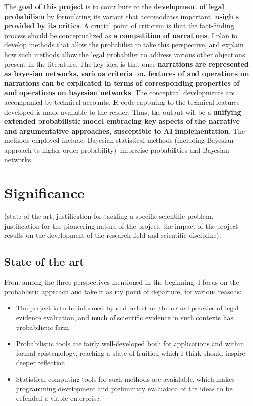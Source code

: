 \documentclass[11pt,dvipsnames,enabledeprecatedfontcommands]{scrartcl}
\begin{document}
The \textbf{goal of this project} is to contribute to the
\textbf{development of legal probabilism} by formulating its variant
that accomodates important \textbf{insights provided by its critics}. A
crucial point of criticism is that the fact-finding process should be
conceptualized as \textbf{a competition of narrations}. I plan to
develop methods that allow the probabilist to take this perspective, and
explain how such methods allow the legal probabilist to address various
other objections present in the literature. The key idea is that once
\textbf{narrations are represented as bayesian networks, various criteria on,  features of  and operations on narrations can be explicated in terms of corresponding properties of and operations on bayesian networks}.
The conceptual developments are accompanied by technical accounts.
\textbf{\textsf{R}} code capturing to the technical features developed
is made available to the reader. Thus, the output will be a
\textbf{unifying extended probabilistic model embracing key aspects of the narrative and argumentative approaches, susceptible to AI implementation.}
The methods employed include: Bayesian statistical methods (including
Bayesian approach to higher-order probability), imprecise probabilities
and Bayesian networks.

\section{Significance}\label{significance}

(state of the art, justification for tackling a specific scientific
problem, justification for the pioneering nature of the project, the
impact of the project results on the development of the research field
and scientific discipline);

\subsection{State of the art}\label{state-of-the-art}

From among the three perspectives mentioned in the beginning, I focus on
the probablistic approach and take it as my point of departure, for
various reasons:

\begin{itemize}
\item
  The project is to be informed by and reflect on the actual practice of
  legal evidence evaluation, and much of scientific evidence in such
  contexts has probabilistic form.
\item
  Probabilistic tools are fairly well-developed both for applications
  and within formal epistemology, reaching a state of fruition which I
  think should inspire deeper reflection.
\item
  Statistical computing tools for such methods are avaialable, which
  makes programming development and preliminary evaluation of the ideas
  to be defended a viable enterprise.
\end{itemize}
\end{document}
